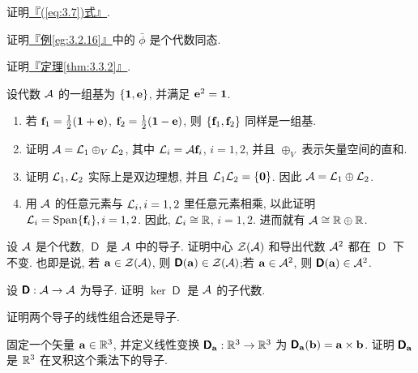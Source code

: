\documentclass[lang=cn,zihao=-4,twoside,fontset=none]{textbook}
\DeclareMathOperator{\Span}{Span}
\newcommand{\bsf}[1]{{\mathop{\pmb{\mathsf{#1}}}}}
\renewcommand{\eqref}[1]{\hyperref[#1]{『\textnormal{(\ref*{#1})}式』}}
\newcommand{\thmref}[1]{\hyperref[#1]{『定理\textnormal{\ref*{#1}}』}}
\newcommand{\egref}[1]{\hyperref[#1]{『例\textnormal{\ref*{#1}}』}}
\newcommand{\set}[1]{\{#1\}}
\newcommand{\nalph}{\textnormal{(\alph*)}}
\newcommand{\bfnull}{\mathbf{0}}
\newcommand{\bfid}{\mathbf{1}}
\begin{document}
\begin{problem}
    \label{ex:3.19}%
    证明\eqref{eq:3.7}.
\end{problem}

\begin{problem}
    \label{ex:3.20}%
    证明\egref{eg:3.2.16}中的 $\bar\phi$ 是个代数同态. 
\end{problem}

\begin{problem}
    \label{ex:3.21}%
    证明\thmref{thm:3.3.2}.
\end{problem}

\begin{problem}
    \label{ex:3.22}%
    设代数 ${\mathcal A}$ 的一组基为 $\set{\bfid,\bfe}$, 并满足 $\bfe^2=\bfid$.
    \begin{enumerate}[label=\nalph]
        \item 若 $\bff_1=\frac{1}{2}(\bfid+\bfe)$, $\bff_2=\frac{1}{2}(\bfid-\bfe)$, 则 $\set{\bff_1,\bff_2}$ 同样是一组基.
        \item 证明 ${\mathcal A}={\mathcal L}_1\oplus_V{\mathcal L}_2$, 其中 ${\mathcal L}_i={\mathcal A}{\mathbf f}_i$, $i=1,2$, 并且 $\oplus_V$ 表示矢量空间的直和.
        \item 证明 ${\mathcal L}_1,{\mathcal L}_2$ 实际上是双边理想, 并且 $\mL_1\mL_2=\set{\bfnull}$. 因此 ${\mathcal A}={\mathcal L}_1\oplus{\mathcal L}_2$.
        \item 用 ${\mathcal A}$ 的任意元素与 ${\mathcal L}_i,i=1,2$ 里任意元素相乘, 以此证明 $\mL_i=\Span\set{\bff_i},i=1,2$. 因此, ${\mathcal L}_i\cong{\mathbb R}$, $i=1,2$. 进而就有 ${\mathcal A}\cong{\mathbb R}\oplus{\mathbb R}$.
    \end{enumerate}
\end{problem}

\begin{problem}
    \label{ex:3.23}%
    设 ${\mathcal A}$ 是个代数, $\bsf{D}$ 是 ${\mathcal A}$ 中的导子. 证明中心 ${\mathcal Z}({\mathcal A})$ 和导出代数 ${\mathcal A}^2$ 都在 $\bsf{D}$ 下不变. 也即是说, 若 ${\mathbf a}\in{\mathcal Z}({\mathcal A})$, 则 $\bsf{D}(\bfa)\in\mZ(\mA)$;若 ${\mathbf a}\in{\mathcal A}^2$, 则 $\bsf{D}(\bfa)\in\mA^2$.
\end{problem}

\begin{problem}
    \label{ex:3.24}%
    设 $\bsf{D}:\mA\to\mA$ 为导子. 证明 $\ker\bsf{D}$ 是 ${\mathcal A}$ 的子代数.
\end{problem}


\begin{problem}
    \label{ex:3.25}%
    证明两个导子的线性组合还是导子.
\end{problem}

\begin{problem}
    \label{ex:3.26}%
    固定一个矢量 ${\mathbf a}\in{\mathbb R}^3$, 并定义线性变换 $\bsf{D}_{\bfa}:\bR^3\to\bR^3$ 为 $\bsf{D}_{\bfa}(\bfb)=\bfa\times\bfb$. 证明 $\bsf{D}_{\bfa}$ 是 ${\mathbb R}^3$ 在叉积这个乘法下的导子. 
\end{problem}
\end{document}
